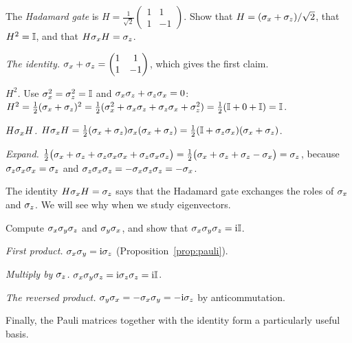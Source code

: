 \begin{example}\label{ex:hadamard}
  The \emph{Hadamard gate} is $H=\frac{1}{\sqrt2}\begin{pmatrix}1&1\\1&-1\end{pmatrix}$. Show that $H=(\sigma_x+\sigma_z)/\sqrt2$, that $H^2=\mathbb{I}$, and that $H\sigma_x H=\sigma_z$.
\end{example}
\begin{solution}
  \begin{steps}
    \item \emph{The identity.} $\sigma_x+\sigma_z=\begin{pmatrix}1&1\\1&-1\end{pmatrix}$, which gives the first claim.
    \item \emph{$H^2$.} Use $\sigma_x^2=\sigma_z^2=\mathbb{I}$ and $\sigma_x\sigma_z+\sigma_z\sigma_x=0$: $H^2=\tfrac12(\sigma_x+\sigma_z)^2=\tfrac12(\sigma_x^2+\sigma_x\sigma_z+\sigma_z\sigma_x+\sigma_z^2)=\tfrac12(\mathbb{I}+0+\mathbb{I})=\mathbb{I}$.
    \item \emph{$H\sigma_x H$.} $H\sigma_x H=\tfrac12(\sigma_x+\sigma_z)\sigma_x(\sigma_x+\sigma_z)=\tfrac12(\mathbb{I}+\sigma_z\sigma_x)(\sigma_x+\sigma_z)$.
    \item \emph{Expand.} $\tfrac12\bigl(\sigma_x+\sigma_z+\sigma_z\sigma_x\sigma_x+\sigma_z\sigma_x\sigma_z\bigr)=\tfrac12\bigl(\sigma_x+\sigma_z+\sigma_z-\sigma_x\bigr)=\sigma_z$, because $\sigma_z\sigma_x\sigma_x=\sigma_z$ and $\sigma_z\sigma_x\sigma_z=-\sigma_x\sigma_z\sigma_z=-\sigma_x$.
  \end{steps}
\end{solution}

The identity $H\sigma_x H=\sigma_z$ says that the Hadamard gate exchanges the roles of $\sigma_x$ and $\sigma_z$. We will see why when we study eigenvectors.

\begin{example}\label{ex:pauli-products}
  Compute $\sigma_x\sigma_y\sigma_z$ and $\sigma_y\sigma_x$, and show that $\sigma_x\sigma_y\sigma_z=\mathrm{i}\mathbb{I}$.
\end{example}
\begin{solution}
  \begin{steps}
    \item \emph{First product.} $\sigma_x\sigma_y=\mathrm{i}\sigma_z$ (Proposition~\ref{prop:pauli}).
    \item \emph{Multiply by $\sigma_z$.} $\sigma_x\sigma_y\sigma_z=\mathrm{i}\sigma_z\sigma_z=\mathrm{i}\mathbb{I}$.
    \item \emph{The reversed product.} $\sigma_y\sigma_x=-\sigma_x\sigma_y=-\mathrm{i}\sigma_z$ by anticommutation.
  \end{steps}
\end{solution}

Finally, the Pauli matrices together with the identity form a particularly useful basis.

